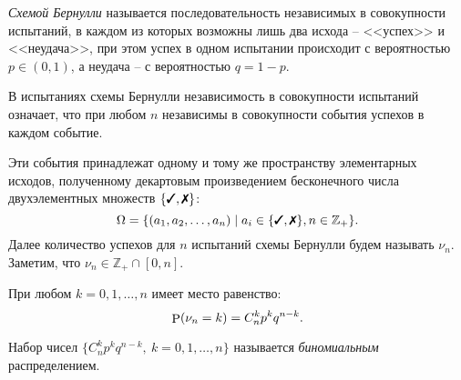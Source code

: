\begin{to_def}
    \textit{Схемой Бернулли} называется последовательность независимых в совокупности испытаний, в каждом из 
    которых возможны лишь два исхода -- <<успех>> и <<неудача>>, при этом успех \cmark в одном испытании происходит с вероятностью $p \in (0, 1)$, а неудача \xmark -- с вероятностью $q = 1 - p$.
\end{to_def}

В испытаниях схемы Бернулли  независимость в совокупности испытаний означает, что при любом $n$ независимы в совокупности события успехов в каждом событие. 

Эти события принадлежат одному и тому же пространству элементарных исходов, полученному декартовым произведением бесконечного числа двухэлементных множеств $\{\cmark, \xmark\}$:
\begin{equation*}
    \Omega = \{(a_1, a_2, \ldots, a_n) \mid a_i \in \{\cmark, \xmark\}, n \in \mathbb{Z}_+\}.
\end{equation*}
Далее количество успехов для $n$ испытаний схемы Бернулли будем называть $\nu_n$. Заметим, что $\nu_n \in \mathbb{Z}_+ \cap [0, n]$. 

\begin{to_thr}
    При любом $k = 0, 1, \ldots, n$ имеет место равенство:
    \begin{equation*}
        \P (\nu_n = k) = C_n^k p^k q^{n-k}.
    \end{equation*}
\end{to_thr}

\begin{to_def}[$\mathfrak D$]
    Набор чисел $\{C_n^k p^k q^{n-k}, \ k = 0, 1, \ldots, n\}$ называется \textit{биномиальным} распределением.
\end{to_def}

